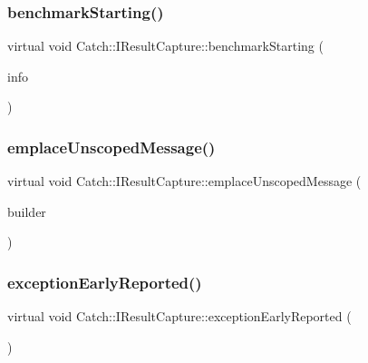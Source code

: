 \mbox{\label{struct_catch_1_1_i_result_capture_a264ae12330c74b2daae41715a30d51bf}} 
\subsubsection{benchmarkStarting()}
{\footnotesize\ttfamily virtual void Catch\+::\+I\+Result\+Capture\+::benchmark\+Starting (\begin{DoxyParamCaption}\item[{Benchmark\+Info const \&}]{info }\end{DoxyParamCaption})\hspace{0.3cm}{\ttfamily [pure virtual]}}

\mbox{\label{struct_catch_1_1_i_result_capture_a49f74f1323ef8be71b8f9b8e8b2c0fc2}} 
\subsubsection{emplaceUnscopedMessage()}
{\footnotesize\ttfamily virtual void Catch\+::\+I\+Result\+Capture\+::emplace\+Unscoped\+Message (\begin{DoxyParamCaption}\item[{\textbf{ Message\+Builder} const \&}]{builder }\end{DoxyParamCaption})\hspace{0.3cm}{\ttfamily [pure virtual]}}

\mbox{\label{struct_catch_1_1_i_result_capture_ae63ecec95db4c236c63ecf616f483810}} 
\subsubsection{exceptionEarlyReported()}
{\footnotesize\ttfamily virtual void Catch\+::\+I\+Result\+Capture\+::exception\+Early\+Reported (\begin{DoxyParamCaption}{ }\end{DoxyParamCaption})\hspace{0.3cm}{\ttfamily [pure virtual]}}

